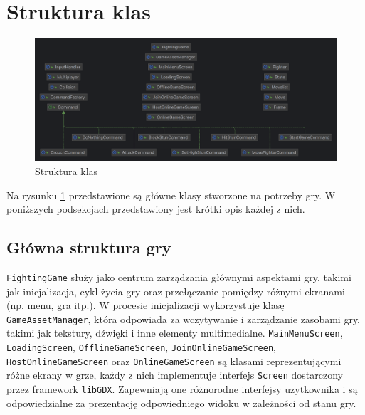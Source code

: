 \section{Struktura klas}
\begin{figure}
	\centering
		\includegraphics[width=1\linewidth]{rys03/struktura_klas}
	\caption{Struktura klas}
	\label{fig:struktura_klas}
\end{figure}

Na rysunku \ref{fig:struktura_klas} przedstawione są główne klasy stworzone na potrzeby gry. W poniższych podsekcjach przedstawiony jest krótki opis każdej z nich.
\subsection{Główna struktura gry}
\texttt{FightingGame} służy jako centrum zarządzania głównymi aspektami gry, takimi jak inicjalizacja, cykl życia gry oraz przełączanie pomiędzy różnymi ekranami (np. menu, gra itp.). W procesie inicjalizacji wykorzystuje klasę \texttt{GameAssetManager}, która odpowiada za wczytywanie i zarządzanie zasobami gry, takimi jak tekstury, dźwięki i inne elementy multimedialne. \texttt{MainMenuScreen}, \texttt{LoadingScreen}, \texttt{OfflineGameScreen}, \texttt{JoinOnlineGameScreen}, \texttt{HostOnlineGameScreen} oraz \texttt{OnlineGameScreen} są klasami reprezentującymi różne ekrany w grze, każdy z nich implementuje interfejs \texttt{Screen} dostarczony przez framework \texttt{libGDX}. Zapewniają one różnorodne interfejsy uzytkownika i są odpowiedzialne za prezentację odpowiedniego widoku w zależności od stanu gry.

